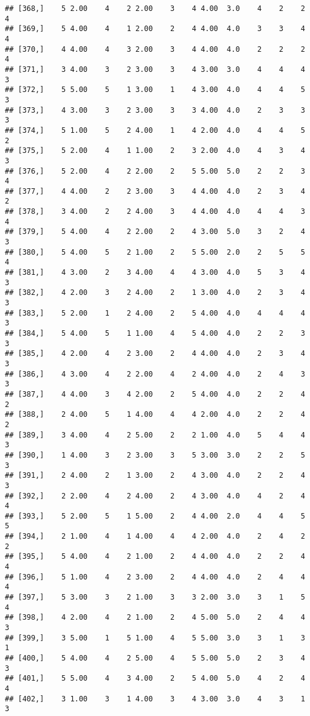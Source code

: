 \documentclass[]{article}
\begin{document}
\begin{verbatim}
## [368,]    5 2.00    4    2 2.00    3    4 4.00  3.0    4    2    2    4
## [369,]    5 4.00    4    1 2.00    2    4 4.00  4.0    3    3    4    4
## [370,]    4 4.00    4    3 2.00    3    4 4.00  4.0    2    2    2    4
## [371,]    3 4.00    3    2 3.00    3    4 3.00  3.0    4    4    4    3
## [372,]    5 5.00    5    1 3.00    1    4 3.00  4.0    4    4    5    3
## [373,]    4 3.00    3    2 3.00    3    3 4.00  4.0    2    3    3    3
## [374,]    5 1.00    5    2 4.00    1    4 2.00  4.0    4    4    5    2
## [375,]    5 2.00    4    1 1.00    2    3 2.00  4.0    4    3    4    3
## [376,]    5 2.00    4    2 2.00    2    5 5.00  5.0    2    2    3    4
## [377,]    4 4.00    2    2 3.00    3    4 4.00  4.0    2    3    4    2
## [378,]    3 4.00    2    2 4.00    3    4 4.00  4.0    4    4    3    4
## [379,]    5 4.00    4    2 2.00    2    4 3.00  5.0    3    2    4    3
## [380,]    5 4.00    5    2 1.00    2    5 5.00  2.0    2    5    5    4
## [381,]    4 3.00    2    3 4.00    4    4 3.00  4.0    5    3    4    3
## [382,]    4 2.00    3    2 4.00    2    1 3.00  4.0    2    3    4    3
## [383,]    5 2.00    1    2 4.00    2    5 4.00  4.0    4    4    4    3
## [384,]    5 4.00    5    1 1.00    4    5 4.00  4.0    2    2    3    3
## [385,]    4 2.00    4    2 3.00    2    4 4.00  4.0    2    3    4    3
## [386,]    4 3.00    4    2 2.00    4    2 4.00  4.0    2    4    3    3
## [387,]    4 4.00    3    4 2.00    2    5 4.00  4.0    2    2    4    2
## [388,]    2 4.00    5    1 4.00    4    4 2.00  4.0    2    2    4    2
## [389,]    3 4.00    4    2 5.00    2    2 1.00  4.0    5    4    4    3
## [390,]    1 4.00    3    2 3.00    3    5 3.00  3.0    2    2    5    3
## [391,]    2 4.00    2    1 3.00    2    4 3.00  4.0    2    2    4    3
## [392,]    2 2.00    4    2 4.00    2    4 3.00  4.0    4    2    4    4
## [393,]    5 2.00    5    1 5.00    2    4 4.00  2.0    4    4    5    5
## [394,]    2 1.00    4    1 4.00    4    4 2.00  4.0    2    4    2    2
## [395,]    5 4.00    4    2 1.00    2    4 4.00  4.0    2    2    4    4
## [396,]    5 1.00    4    2 3.00    2    4 4.00  4.0    2    4    4    4
## [397,]    5 3.00    3    2 1.00    3    3 2.00  3.0    3    1    5    4
## [398,]    4 2.00    4    2 1.00    2    4 5.00  5.0    2    4    4    3
## [399,]    3 5.00    1    5 1.00    4    5 5.00  3.0    3    1    3    1
## [400,]    5 4.00    4    2 5.00    4    5 5.00  5.0    2    3    4    3
## [401,]    5 5.00    4    3 4.00    2    5 4.00  5.0    4    2    4    4
## [402,]    3 1.00    3    1 4.00    3    4 3.00  3.0    4    3    1    3

\end{verbatim}
\end{document}
